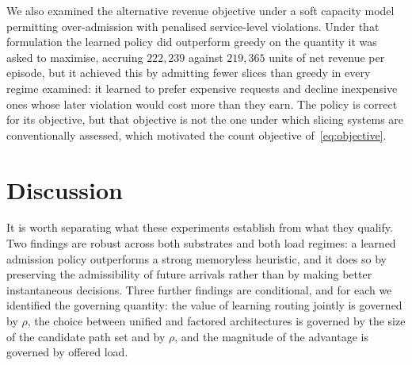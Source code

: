 \documentclass[10pt,journal,comsoc]{IEEEtran}
\begin{document}
We also examined the alternative revenue objective under a soft capacity
model permitting over-admission with penalised service-level violations.
Under that formulation the learned policy did outperform greedy on the
quantity it was asked to maximise, accruing $222{,}239$ against $219{,}365$
units of net revenue per episode, but it achieved this by admitting fewer
slices than greedy in every regime examined: it learned to prefer
expensive requests and decline inexpensive ones whose later violation
would cost more than they earn. The policy is correct for its objective,
but that objective is not the one under which slicing systems are
conventionally assessed, which motivated the count objective
of~\eqref{eq:objective}.

\section{Discussion} \label{discussion}
It is worth separating what these experiments establish from what they
qualify. Two findings are robust across both substrates and both load
regimes: a learned admission policy outperforms a strong memoryless
heuristic, and it does so by preserving the admissibility of future
arrivals rather than by making better instantaneous decisions. Three
further findings are conditional, and for each we identified the governing
quantity: the value of learning routing jointly is governed by $\rho$, the
choice between unified and factored architectures is governed by the size
of the candidate path set and by $\rho$, and the magnitude of the
advantage is governed by offered load.
\end{document}
